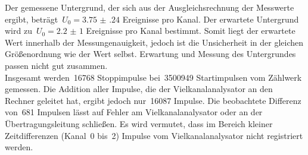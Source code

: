 Der gemessene Untergrund, der sich aus der Ausgleichsrechnung der Messwerte
ergibt, beträgt~$U_0=\num{3.75(24)}$ Ereignisse pro Kanal. Der erwartete
Untergrund wird zu~$U_0=\num{2.2(10)}$ Ereignisse pro Kanal bestimmt.
Somit liegt der erwartete Wert innerhalb der Messungenauigkeit, jedoch ist die
Unsicherheit in der gleichen Größenordnung wie der Wert selbst. Erwartung und Messung
des Untergrundes passen nicht gut zusammen.\\
Insgesamt werden~\num{16768} Stoppimpulse bei~\num{3500949} Startimpulsen
vom Zählwerk gemessen. Die Addition aller Impulse, die der Vielkanalanalysator
an den Rechner geleitet hat, ergibt jedoch nur~\num{16087} Impulse. Die
beobachtete Differenz von~\num{681} Impulsen lässt auf Fehler am
Vielkanalanalysator oder an der Übertragungsleitung schließen. Es wird vermutet,
dass im Bereich kleiner Zeitdifferenzen (Kanal~\num{0} bis~\num{2})
Impulse vom Vielkanalanalysator nicht registriert werden.

